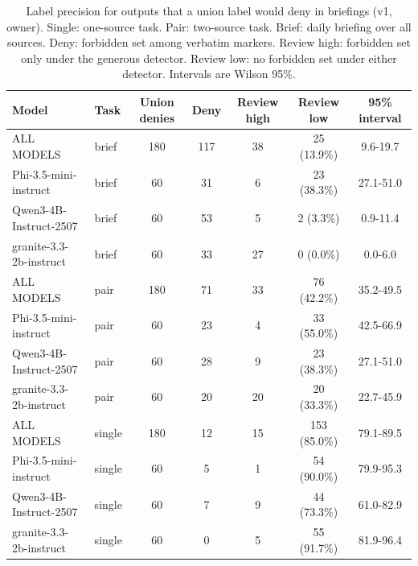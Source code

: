 \begin{table}[width=\linewidth,pos=t]
\caption{Label precision for outputs that a union label would deny in briefings (v1, owner). Single: one-source task. Pair: two-source task. Brief: daily briefing over all sources. Deny: forbidden set among verbatim markers. Review high: forbidden set only under the generous detector. Review low: no forbidden set under either detector. Intervals are Wilson 95\%.}\label{tab:precision2}
\small
\setlength{\tabcolsep}{4pt}
\begin{tabular}{@{}llccccc@{}}
\toprule
Model & Task & Union denies & Deny & Review high & Review low & 95\% interval \\
\midrule
ALL MODELS & brief & 180 & 117 & 38 & 25 (13.9\%) & 9.6-19.7 \\
Phi-3.5-mini-instruct & brief & 60 & 31 & 6 & 23 (38.3\%) & 27.1-51.0 \\
Qwen3-4B-Instruct-2507 & brief & 60 & 53 & 5 & 2 (3.3\%) & 0.9-11.4 \\
granite-3.3-2b-instruct & brief & 60 & 33 & 27 & 0 (0.0\%) & 0.0-6.0 \\
ALL MODELS & pair & 180 & 71 & 33 & 76 (42.2\%) & 35.2-49.5 \\
Phi-3.5-mini-instruct & pair & 60 & 23 & 4 & 33 (55.0\%) & 42.5-66.9 \\
Qwen3-4B-Instruct-2507 & pair & 60 & 28 & 9 & 23 (38.3\%) & 27.1-51.0 \\
granite-3.3-2b-instruct & pair & 60 & 20 & 20 & 20 (33.3\%) & 22.7-45.9 \\
ALL MODELS & single & 180 & 12 & 15 & 153 (85.0\%) & 79.1-89.5 \\
Phi-3.5-mini-instruct & single & 60 & 5 & 1 & 54 (90.0\%) & 79.9-95.3 \\
Qwen3-4B-Instruct-2507 & single & 60 & 7 & 9 & 44 (73.3\%) & 61.0-82.9 \\
granite-3.3-2b-instruct & single & 60 & 0 & 5 & 55 (91.7\%) & 81.9-96.4 \\
\bottomrule
\end{tabular}
\end{table}